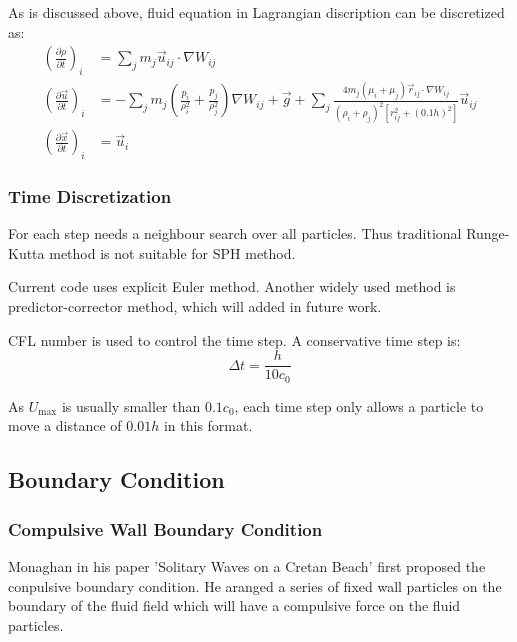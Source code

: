 As is discussed above, 
fluid equation in Lagrangian discription can be discretized as:
\begin{equation}
    \begin{aligned}
        \left(\frac{\partial\rho}{\partial t}\right)_i
        &=
        \sum_j m_j \vec{u}_{ij} \cdot \nabla W_{ij}\\
        \left(\frac{\partial\vec{u}}{\partial t}\right)_i
        &=
        -\sum_j m_j \left(\frac{p_i}{\rho_i^2} + \frac{p_j}{\rho_j^2}\right) \nabla W_{ij} + 
        \vec{g} + 
        \sum_j \frac{4m_j(\mu_i+\mu_j)\vec{r}_{ij}\cdot \nabla W_{ij}}{(\rho_i+\rho_j)^2[r_{ij}^2+(0.1h)^2]}\vec{u}_{ij}\\
        \left(\frac{\partial \vec{x}}{\partial t}\right)_i
        &=
        \vec{u}_i
    \end{aligned}
\end{equation}

\subsubsection{Time Discretization}

For each step needs a neighbour search over all particles.
Thus traditional Runge-Kutta method is not suitable for SPH method.

Current code uses explicit Euler method. 
Another widely used method is predictor-corrector method,
which will added in future work.

CFL number is used to control the time step.
A conservative time step is:
\begin{equation}
    \Delta t=\frac{h}{10c_0}
\end{equation}

As $U_{\max}$ is usually smaller than $0.1c_0$,
each time step only allows a particle to move a distance of $0.01h$ in this format.

\subsection{Boundary Condition}

\subsubsection{Compulsive Wall Boundary Condition}

Monaghan in his paper 'Solitary Waves on a Cretan Beach' first proposed the conpulsive boundary condition.
He aranged a series of fixed wall particles on the boundary of the fluid field 
which will have a compulsive force on the fluid particles.

